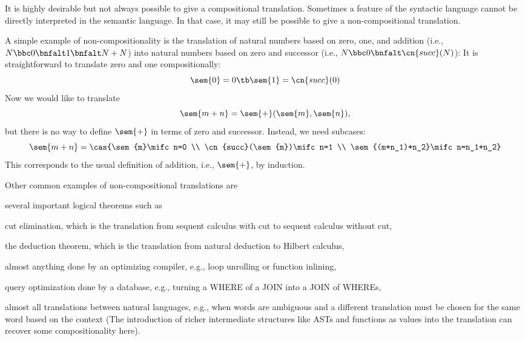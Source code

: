 It is highly desirable but not always possible to give a compositional translation.
Sometimes a feature of the syntactic language cannot be directly interpreted in the semantic language.
In that case, it may still be possible to give a non-compositional translation.

\begin{example}
A simple example of non-compositionality is the translation of natural numbers based on zero, one, and addition (i.e., $N\bbc 0\bnfalt 1\bnfalt N+N$) into natural numbers based on zero and successor (i.e., $N\bbc 0\bnfalt\cn{succ}(N)$):
It is straightforward to translate zero and one compositionally:
\[\sem{0}=0 \tb\sem{1}=\cn{succ}(0)\]
Now we would like to translate \[\sem{m+n}=\sem{+}(\sem{m},\sem{n}),\] but there is no way to define $\sem{+}$ in terms of zero and successor.
Instead, we need subcases:
\[\sem{m+n}=\cas{\sem{m}\mifc n=0 \\ \cn{succ}(\sem{m})\mifc n=1 \\ \sem{(m+n_1)+n_2}\mifc n=n_1+n_2}\]
This corresponds to the usual definition of addition, i.e., $\sem{+}$, by induction.
\end{example}

Other common examples of non-compositional translations are
\begin{compactitem}
 \item several important logical theorems such as
  \begin{compactitem}
   \item cut elimination, which is the translation from sequent calculus with cut to sequent calculus without cut,
   \item the deduction theorem, which is the translation from natural deduction to Hilbert calculus,
  \end{compactitem}
 \item almost anything done by an optimizing compiler, e.g., loop unrolling or function inlining,
 \item query optimization done by a database, e.g., turning a WHERE of a JOIN into a JOIN of WHEREs,
 \item almost all translations between natural languages, e.g., when words are ambiguous and a different translation must be chosen for the same word based on the context (The introduction of richer intermediate structures like ASTs and functions as values into the translation can recover some compositionality here).
\end{compactitem}

